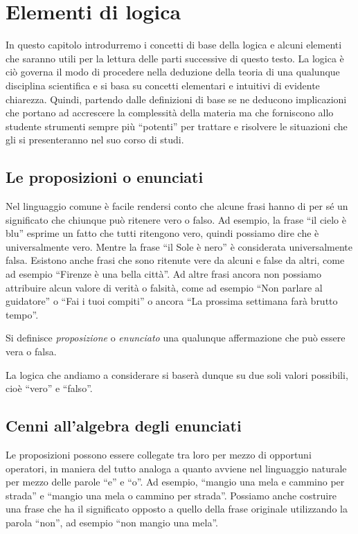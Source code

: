\chapter{Elementi di logica}

In questo capitolo introdurremo i concetti di base della logica e alcuni elementi che saranno utili per la lettura delle parti successive di questo testo.
La logica è ciò governa il modo di procedere nella deduzione della teoria di una qualunque disciplina scientifica e si basa su concetti elementari e intuitivi di evidente chiarezza. Quindi, partendo dalle definizioni di base se ne deducono implicazioni che portano ad accrescere la complessità della materia ma che forniscono allo studente strumenti sempre più ``potenti'' per trattare e risolvere le situazioni che gli si presenteranno nel suo corso di studi.

\section{Le proposizioni o enunciati}

Nel linguaggio comune è facile rendersi conto che alcune frasi hanno di per sé un significato che chiunque può ritenere vero o falso. Ad esempio, la frase ``il cielo è blu'' esprime un fatto che tutti ritengono vero, quindi possiamo dire che è universalmente vero. Mentre la frase ``il Sole è nero'' è considerata universalmente falsa. Esistono anche frasi che sono ritenute vere da alcuni e false da altri, come ad esempio ``Firenze è una bella città''. Ad altre frasi ancora non possiamo attribuire alcun valore di verità o falsità, come ad esempio ``Non parlare al guidatore'' o ``Fai i tuoi compiti'' o ancora ``La prossima settimana farà brutto tempo''.

\begin{definizione}
Si definisce \emph{proposizione} o \emph{enunciato} una qualunque affermazione che può essere vera o falsa.
\end{definizione}

La logica che andiamo a considerare si baserà dunque su due soli valori possibili, cioè ``vero'' e ``falso''.

\section{Cenni all'algebra degli enunciati}

Le proposizioni possono essere collegate tra loro per mezzo di opportuni operatori, in maniera del tutto analoga a quanto avviene nel linguaggio naturale per mezzo delle parole ``e'' e ``o''. Ad esempio, ``mangio una mela e cammino per strada'' e ``mangio una mela o cammino per strada''. Possiamo anche costruire una frase che ha il significato opposto a quello della frase originale utilizzando la parola ``non'', ad esempio ``non mangio una mela''.


